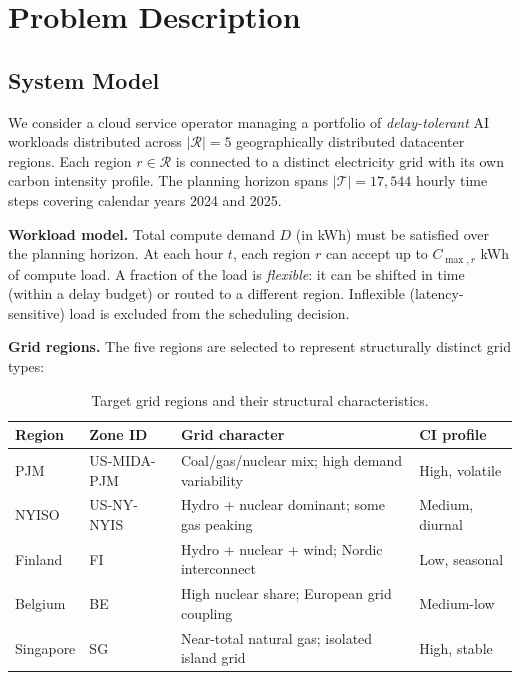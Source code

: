 \section{Problem Description}
\label{sec:problem}

\subsection{System Model}

We consider a cloud service operator managing a portfolio of \emph{delay-tolerant} AI workloads distributed across $|\mathcal{R}| = 5$ geographically distributed datacenter regions.
Each region $r \in \mathcal{R}$ is connected to a distinct electricity grid with its own carbon intensity profile.
The planning horizon spans $|\mathcal{T}| = 17{,}544$ hourly time steps covering calendar years 2024 and 2025.

\textbf{Workload model.}
Total compute demand $D$ (in kWh) must be satisfied over the planning horizon.
At each hour $t$, each region $r$ can accept up to $C_{\max,r}$ kWh of compute load.
A fraction of the load is \emph{flexible}: it can be shifted in time (within a delay budget) or routed to a different region.
Inflexible (latency-sensitive) load is excluded from the scheduling decision.

\textbf{Grid regions.}
The five regions are selected to represent structurally distinct grid types:

\begin{table}[h]
\centering
\begin{tabular}{llp{5.5cm}l}
\toprule
\textbf{Region} & \textbf{Zone ID} & \textbf{Grid character} & \textbf{CI profile} \\
\midrule
PJM       & US-MIDA-PJM & Coal/gas/nuclear mix; high demand variability & High, volatile \\
NYISO     & US-NY-NYIS  & Hydro + nuclear dominant; some gas peaking & Medium, diurnal \\
Finland   & FI          & Hydro + nuclear + wind; Nordic interconnect  & Low, seasonal \\
Belgium   & BE          & High nuclear share; European grid coupling  & Medium-low \\
Singapore & SG          & Near-total natural gas; isolated island grid & High, stable \\
\bottomrule
\end{tabular}
\caption{Target grid regions and their structural characteristics.}
\label{tab:regions}
\end{table}


